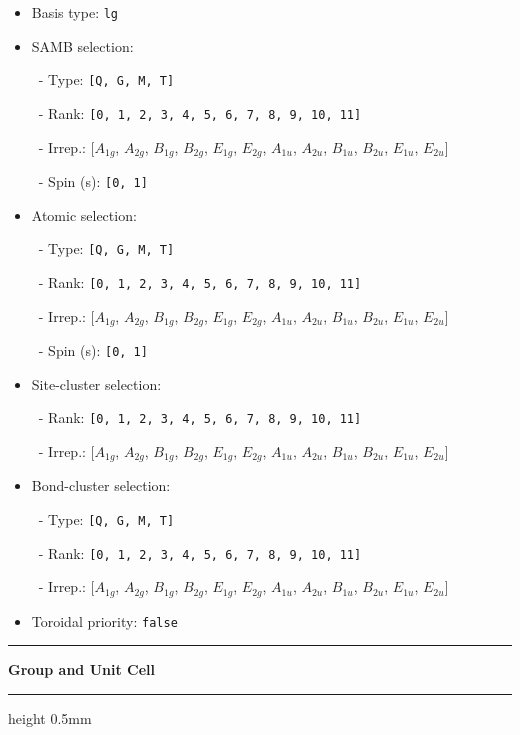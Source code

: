 \documentclass[fleqn,10pt,landscape]{jsarticle}
\begin{document}
\begin{itemize}
\item Basis type: \texttt{lg}

\item SAMB selection:

\, - Type: \texttt{[Q, G, M, T]}

\, - Rank: \texttt{[0, 1, 2, 3, 4, 5, 6, 7, 8, 9, 10, 11]}

\, - Irrep.: [$A_{1g}$, $A_{2g}$, $B_{1g}$, $B_{2g}$, $E_{1g}$, $E_{2g}$, $A_{1u}$, $A_{2u}$, $B_{1u}$, $B_{2u}$, $E_{1u}$, $E_{2u}$]

\, - Spin (s): \texttt{[0, 1]}

\item Atomic selection:

\, - Type: \texttt{[Q, G, M, T]}

\, - Rank: \texttt{[0, 1, 2, 3, 4, 5, 6, 7, 8, 9, 10, 11]}

\, - Irrep.: [$A_{1g}$, $A_{2g}$, $B_{1g}$, $B_{2g}$, $E_{1g}$, $E_{2g}$, $A_{1u}$, $A_{2u}$, $B_{1u}$, $B_{2u}$, $E_{1u}$, $E_{2u}$]

\, - Spin (s): \texttt{[0, 1]}

\item Site-cluster selection:

\, - Rank: \texttt{[0, 1, 2, 3, 4, 5, 6, 7, 8, 9, 10, 11]}

\, - Irrep.: [$A_{1g}$, $A_{2g}$, $B_{1g}$, $B_{2g}$, $E_{1g}$, $E_{2g}$, $A_{1u}$, $A_{2u}$, $B_{1u}$, $B_{2u}$, $E_{1u}$, $E_{2u}$]

\item Bond-cluster selection:

\, - Type: \texttt{[Q, G, M, T]}

\, - Rank: \texttt{[0, 1, 2, 3, 4, 5, 6, 7, 8, 9, 10, 11]}

\, - Irrep.: [$A_{1g}$, $A_{2g}$, $B_{1g}$, $B_{2g}$, $E_{1g}$, $E_{2g}$, $A_{1u}$, $A_{2u}$, $B_{1u}$, $B_{2u}$, $E_{1u}$, $E_{2u}$]

\item Toroidal priority: \texttt{false}

\end{itemize}
\vspace{5mm}
\noindent \rule[0.5mm]{5mm}{0.5mm}\hspace{3mm}\textbf{Group and Unit Cell}\hspace{3mm}\leaders\hrule height 0.5mm\hfill\kern0pt
\vspace{3mm}
\end{document}

